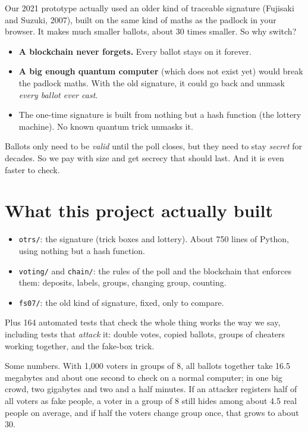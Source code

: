\documentclass[11pt,a4paper]{article}
\begin{document}
Our 2021 prototype actually used an older kind of traceable signature
(Fujisaki and Suzuki, 2007), built on the same kind of maths as the
padlock in your browser. It makes much smaller ballots, about 30 times
smaller. So why switch?

\begin{itemize}[leftmargin=*]
  \item \textbf{A blockchain never forgets.} Every ballot stays on it
        forever.
  \item \textbf{A big enough quantum computer} (which does not exist yet)
        would break the padlock maths. With the old signature, it could go
        back and unmask \emph{every ballot ever cast}.
  \item The one-time signature is built from nothing but a hash function
        (the lottery machine). No known quantum trick unmasks it.
\end{itemize}

Ballots only need to be \emph{valid} until the poll closes, but they need
to stay \emph{secret} for decades. So we pay with size and get secrecy
that should last. And it is even faster to check.

\section{What this project actually built}

\begin{itemize}[leftmargin=*]
  \item \texttt{otrs/}: the signature (trick boxes and lottery). About 750
        lines of Python, using nothing but a hash function.
  \item \texttt{voting/} and \texttt{chain/}: the rules of the poll and the
        blockchain that enforces them: deposits, labels, groups, changing
        group, counting.
  \item \texttt{fs07/}: the old kind of signature, fixed, only to compare.
\end{itemize}

Plus 164 automated tests that check the whole thing works the way we say,
including tests that \emph{attack} it: double votes, copied ballots,
groups of cheaters working together, and the fake-box trick.

Some numbers. With 1{,}000 voters in groups of 8, all ballots together take
16.5 megabytes and about one second to check on a normal computer; in one
big crowd, two gigabytes and two and a half minutes. If an attacker
registers half of all voters as fake people, a voter in a group of 8 still
hides among about 4.5 real people on average, and if half the voters change
group once, that grows to about 30.
\end{document}
